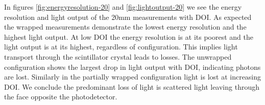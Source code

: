 In figures \ref{fig:energyresolution-20} and \ref{fig:lightoutput-20} we see the energy resolution and light output of the 20mm measurements with DOI. As expected the wrapped measurements demonstrate the lowest energy resolution and the highest light output.  At low DOI the energy resolution is at its poorest and the light output is at its highest, regardless of configuration. This implies light transport through the scintillator crystal leads to losses. The unwrapped configuration shows the largest drop in light output with DOI, indicating photons are lost. Similarly in the partially wrapped configuration light is lost at increasing DOI. We conclude the predominant loss of light is scattered light leaving through the face opposite the photodetector.